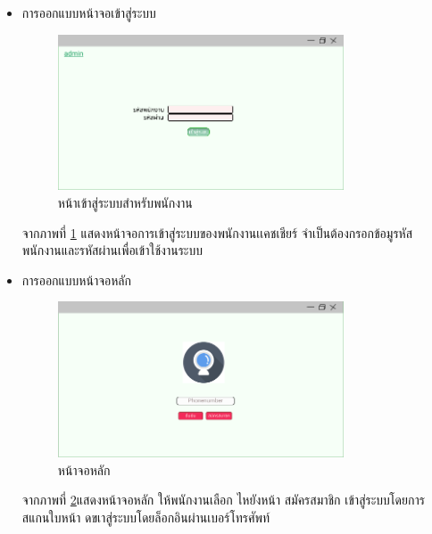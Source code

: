 			\begin{itemize}
				
					\item  การออกแบบหน้าจอเข้าสู่ระบบ
				\begin{figure}[H]
					\centering
					\includegraphics[width=0.8\textwidth]{Figures/3/UIWeb/login}
					\caption{หน้าเข้าสู่ระบบสำหรับพนักงาน}
					\label{Fig:login}
				\end{figure}
				จากภาพที่ \ref{Fig:login}  แสดงหน้าจอการเข้าสู่ระบบของพนักงานเเคชเชียร์ จำเป็นต้องกรอกข้อมูรหัสพนักงานและรหัสผ่านเพื่อเข้าใช้งานระบบ
				\en
				\item การออกแบบหน้าจอหลัก
				\begin{figure}[H]
					\centering
					\includegraphics[width=0.8\textwidth]{Figures/3/UIWeb/Homepage}
					\caption{หน้าจอหลัก}
					\label{Fig:Homepage}
				\end{figure}
				จากภาพที่ \ref{Fig:Homepage}แสดงหน้าจอหลัก ให้พนักงานเลือก
				ไหยังหน้า สมัครสมาชิก เข้าสู่ระบบโดยการสแกนใบหน้า ดขเาสู่ระบบโดยล็อกอินผ่านเบอร์โทรศัพท์ 
				

\end{itemize}
